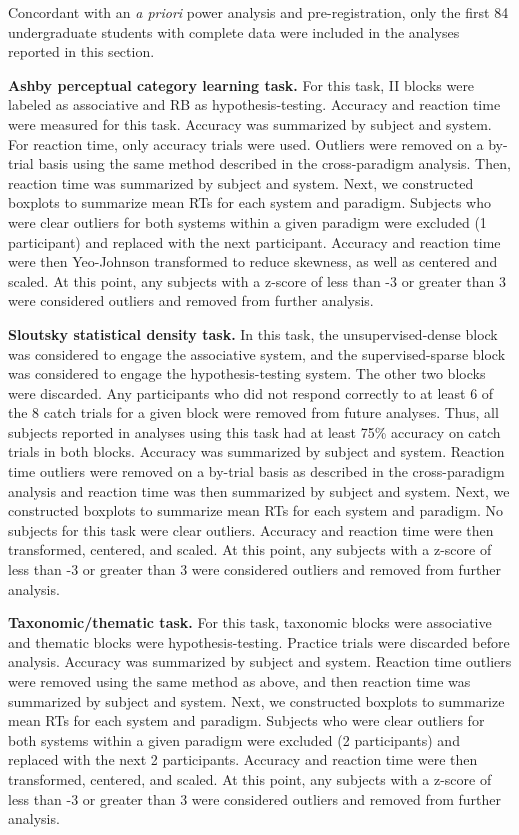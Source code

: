 \documentclass[../dissertation.tex]{subfiles}
\begin{document}
Concordant with an \textit{a priori} power analysis and pre-registration, only the first 84 undergraduate students with complete data were included in the analyses reported in this section.  \par
	\textbf{Ashby perceptual category learning task.} For this task, II blocks were labeled as associative and RB as hypothesis-testing. Accuracy and reaction time were measured for this task. Accuracy was summarized by subject and system. For reaction time, only accuracy trials were used. Outliers were removed on a by-trial basis using the same method described in the cross-paradigm analysis. Then, reaction time was summarized by subject and system. Next, we constructed boxplots to summarize mean RTs for each system and paradigm. Subjects who were clear outliers for both systems within a given paradigm were excluded (1 participant) and replaced with the next participant. Accuracy and reaction time were then Yeo-Johnson transformed to reduce skewness, as well as centered and scaled. At this point, any subjects with a z-score of less than -3 or greater than 3 were considered outliers and removed from further analysis. \par
	\textbf{Sloutsky statistical density task.} In this task, the unsupervised-dense block was considered to engage the associative system, and the supervised-sparse block was considered to engage the hypothesis-testing system. The other two blocks were discarded. Any participants who did not respond correctly to at least 6 of the 8 catch trials for a given block were removed from future analyses. Thus, all subjects reported in analyses using this task had at least 75\% accuracy on catch trials in both blocks. Accuracy was summarized by subject and system. Reaction time outliers were removed on a by-trial basis as described in the cross-paradigm analysis and reaction time was then summarized by subject and system. Next, we constructed boxplots to summarize mean RTs for each system and paradigm. No subjects for this task were clear outliers. Accuracy and reaction time were then transformed, centered, and scaled. At this point, any subjects with a z-score of less than -3 or greater than 3 were considered outliers and removed from further analysis. \par
	\textbf{Taxonomic/thematic task.} For this task, taxonomic blocks were associative and thematic blocks were hypothesis-testing. Practice trials were discarded before analysis. Accuracy was summarized by subject and system. Reaction time outliers were removed using the same method as above, and then reaction time was summarized by subject and system. Next, we constructed boxplots to summarize mean RTs for each system and paradigm. Subjects who were clear outliers for both systems within a given paradigm were excluded (2 participants) and replaced with the next  2 participants. Accuracy and reaction time were then transformed, centered, and scaled. At this point, any subjects with a z-score of less than -3 or greater than 3 were considered outliers and removed from further analysis. \par	
	
\end{document}
